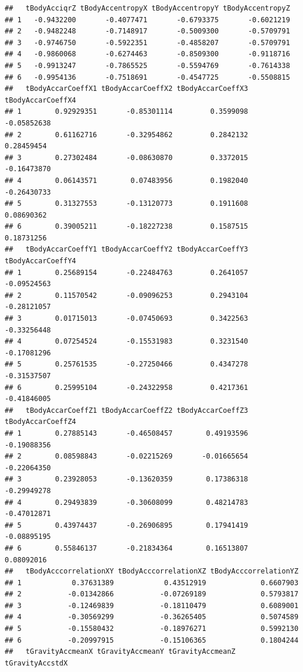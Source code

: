 \documentclass[
]{article}
\begin{document}
\begin{verbatim}
##   tBodyAcciqrZ tBodyAccentropyX tBodyAccentropyY tBodyAccentropyZ
## 1   -0.9432200       -0.4077471       -0.6793375       -0.6021219
## 2   -0.9482248       -0.7148917       -0.5009300       -0.5709791
## 3   -0.9746750       -0.5922351       -0.4858207       -0.5709791
## 4   -0.9860068       -0.6274463       -0.8509300       -0.9118716
## 5   -0.9913247       -0.7865525       -0.5594769       -0.7614338
## 6   -0.9954136       -0.7518691       -0.4547725       -0.5508815
##   tBodyAccarCoeffX1 tBodyAccarCoeffX2 tBodyAccarCoeffX3 tBodyAccarCoeffX4
## 1        0.92929351       -0.85301114         0.3599098       -0.05852638
## 2        0.61162716       -0.32954862         0.2842132        0.28459454
## 3        0.27302484       -0.08630870         0.3372015       -0.16473870
## 4        0.06143571        0.07483956         0.1982040       -0.26430733
## 5        0.31327553       -0.13120773         0.1911608        0.08690362
## 6        0.39005211       -0.18227238         0.1587515        0.18731256
##   tBodyAccarCoeffY1 tBodyAccarCoeffY2 tBodyAccarCoeffY3 tBodyAccarCoeffY4
## 1        0.25689154       -0.22484763         0.2641057       -0.09524563
## 2        0.11570542       -0.09096253         0.2943104       -0.28121057
## 3        0.01715013       -0.07450693         0.3422563       -0.33256448
## 4        0.07254524       -0.15531983         0.3231540       -0.17081296
## 5        0.25761535       -0.27250466         0.4347278       -0.31537507
## 6        0.25995104       -0.24322958         0.4217361       -0.41846005
##   tBodyAccarCoeffZ1 tBodyAccarCoeffZ2 tBodyAccarCoeffZ3 tBodyAccarCoeffZ4
## 1        0.27885143       -0.46508457        0.49193596       -0.19088356
## 2        0.08598843       -0.02215269       -0.01665654       -0.22064350
## 3        0.23928053       -0.13620359        0.17386318       -0.29949278
## 4        0.29493839       -0.30608099        0.48214783       -0.47012871
## 5        0.43974437       -0.26906895        0.17941419       -0.08895195
## 6        0.55846137       -0.21834364        0.16513807        0.08092016
##   tBodyAcccorrelationXY tBodyAcccorrelationXZ tBodyAcccorrelationYZ
## 1            0.37631389            0.43512919             0.6607903
## 2           -0.01342866           -0.07269189             0.5793817
## 3           -0.12469839           -0.18110479             0.6089001
## 4           -0.30569299           -0.36265405             0.5074589
## 5           -0.15580432           -0.18976271             0.5992130
## 6           -0.20997915           -0.15106365             0.1804244
##   tGravityAccmeanX tGravityAccmeanY tGravityAccmeanZ tGravityAccstdX

\end{verbatim}
\end{document}
